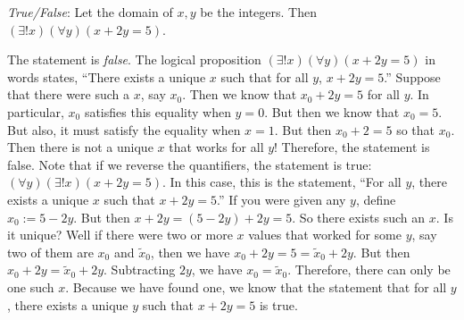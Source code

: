 \documentclass[11pt,letterpaper]{article}
\begin{document}
\quizsol \textit{True/False}: Let the domain of $x, y$ be the integers. Then $(\exists! x)(\forall y)(x + 2y= 5)$. \pspace

\sol The statement is \textit{false}. The logical proposition $(\exists! x)(\forall y)(x + 2y= 5)$ in words states, ``There exists a unique $x$ such that for all $y$, $x + 2y= 5$.'' Suppose that there were such a $x$, say $x_0$. Then we know that $x_0 + 2y= 5$ for all $y$. In particular, $x_0$ satisfies this equality when $y= 0$. But then we know that $x_0= 5$. But also, it must satisfy the equality when $x= 1$. But then $x_0 + 2= 5$ so that $x_0$. Then there is not a unique $x$ that works for all $y$! Therefore, the statement is false. Note that if we reverse the quantifiers, the statement is true: $(\forall y)(\exists! x)(x + 2y= 5)$. In this case, this is the statement, ``For all $y$, there exists a unique $x$ such that $x + 2y= 5$.'' If you were given any $y$, define $x_0:= 5 - 2y$. But then $x + 2y= (5 - 2y) + 2y= 5$. So there exists such an $x$. Is it unique? Well if there were two or more $x$ values that worked for some $y$, say two of them are $x_0$ and $\tilde{x}_0$, then we have $x_0 + 2y= 5= \tilde{x}_0 + 2y$. But then $x_0 + 2y= \tilde{x}_0 + 2y$. Subtracting $2y$, we have $x_0 = \tilde{x}_0$. Therefore, there can only be one such $x$. Because we have found one, we know that the statement that for all $y$, there exists a unique $y$ such that $x + 2y= 5$ is true. 




\newpage








\end{document}
